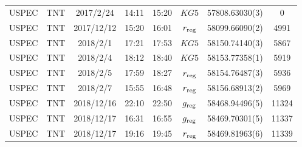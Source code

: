 \begin{table}
\begin{center}
\begin{tabular}{cccccccc}
			USPEC & TNT     & 2017/2/24  & 14:11 & 15:20 & $KG5$                                 & 57808.63030(3)                                                                                                            &                                           0 \\
			USPEC & TNT     & 2017/12/12 & 15:20 & 16:01 & $r_{\rm reg}$                         & 58099.66090(2)                                                                                                            &                                        4991 \\
			USPEC & TNT     & 2018/2/1   & 17:21 & 17:53 & $KG5$                                 & 58150.74140(3)                                                                                                            &                                        5867 \\
			USPEC & TNT     & 2018/2/4   & 18:12 & 18:40 & $KG5$                                 & 58153.77358(1)                                                                                                            &                                        5919 \\
			USPEC & TNT     & 2018/2/5   & 17:59 & 18:27 & $r_{\rm reg}$                         & 58154.76487(3)                                                                                                            &                                        5936 \\
			USPEC & TNT     & 2018/2/7   & 15:55 & 16:48 & $r_{\rm reg}$                         & 58156.68913(2)                                                                                                            &                                        5969 \\
			USPEC & TNT     & 2018/12/16 & 22:10 & 22:50 & $g_{\rm reg}$                         & 58468.94496(5)                                                                                                            &                                       11324 \\
			USPEC & TNT     & 2018/12/17 & 16:31 & 16:55 & $g_{\rm reg}$                         & 58469.70301(5)                                                                                                            &                                       11337 \\
			USPEC & TNT     & 2018/12/17 & 19:16 & 19:45 & $r_{\rm reg}$                         & 58469.81963(6)                                                                                                            &                                       11339 \\

\end{tabular}
\end{center}
\end{table}
